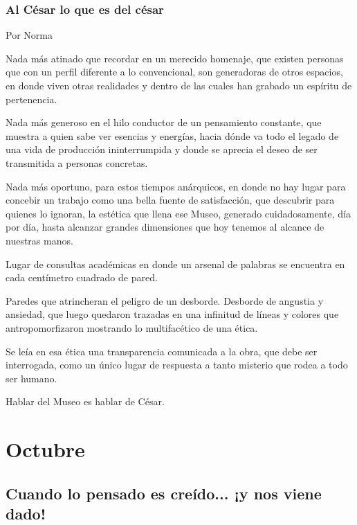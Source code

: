 \documentclass[11pt,twoside,openright,a5paper]{book}
\begin{document}
\section*{Al César lo que es del césar}

                                                                              \begin{flushright}Por Norma\end{flushright}

Nada más atinado que recordar en un merecido homenaje, que existen personas que con un perfil diferente a lo convencional, son generadoras de otros espacios, en donde viven otras realidades  y dentro de las cuales han grabado un espíritu de pertenencia.

Nada más generoso en el hilo conductor de un pensamiento constante, que muestra a quien sabe ver esencias y energías, hacia dónde va todo el legado de una vida de producción ininterrumpida y donde se aprecia el deseo de ser transmitida a personas concretas.

Nada más oportuno, para estos tiempos anárquicos, en donde no hay lugar para concebir un trabajo como una bella fuente de satisfacción, que descubrir para quienes lo ignoran, la estética que llena ese Museo, generado cuidadosamente, día por día, hasta alcanzar grandes dimensiones que hoy tenemos al alcance de nuestras manos.

Lugar de consultas académicas en donde un arsenal de palabras se encuentra en cada centímetro cuadrado de pared.

Paredes que atrincheran el peligro de un desborde. Desborde de angustia y ansiedad, que luego quedaron trazadas en una infinitud de líneas y colores que antropomorfizaron mostrando lo multifacético de una ética.

Se leía en esa ética una transparencia comunicada a la obra, que debe ser interrogada, como un único lugar de respuesta a tanto misterio que rodea a todo ser humano.

Hablar del Museo es hablar de César.

\part*{Octubre}

\chapter*{Cuando lo pensado es creído... ¡y nos viene dado!}
\end{document}
